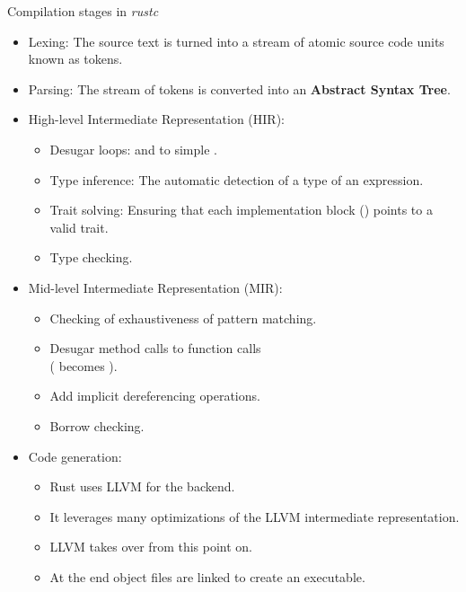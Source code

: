 \documentclass{beamer}
\begin{document}
\begin{frame}{Compilation stages in \emph{rustc}}
  \scriptsize

  \begin{itemize}
    \item Lexing: The source text is turned into a stream of atomic source code units known as tokens.
    \pause
    \item Parsing: The stream of tokens is converted into an \textbf{Abstract Syntax Tree}.
    \pause
    \item High-level Intermediate Representation (HIR):
    \begin{itemize}
      \scriptsize
      [circle]
      \item Desugar loops:  and  to simple .
      \item Type inference: The automatic detection of a type of an expression.
      \item Trait solving: Ensuring that each implementation block () points to a valid trait.
      \item Type checking.
    \end{itemize}
    \pause
    \item Mid-level Intermediate Representation (MIR): 
    \begin{itemize}
      \scriptsize
      [circle]
      \item Checking of exhaustiveness of pattern matching.
      \item Desugar method calls to function calls\\
                    ( becomes ).
      \item Add implicit dereferencing operations.
      \item Borrow checking.
    \end{itemize}
    \pause
    \item Code generation:
    \begin{itemize}
      \scriptsize
      [circle]
      \item Rust uses LLVM for the backend.
      \item It leverages many optimizations of the LLVM intermediate representation.
      \item LLVM takes over from this point on.
      \item At the end object files are linked to create an executable.
    \end{itemize}
  \end{itemize}
\end{frame}
\end{document}
